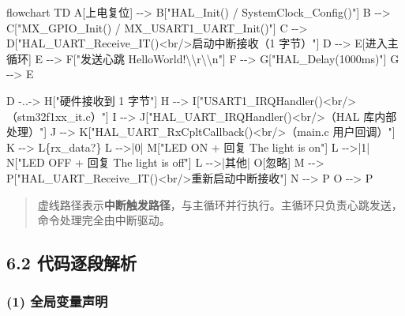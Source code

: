 \documentclass[
  chinese,
  UTF8,
  oneside,
  openany]{ctexbook}
\newenvironment{Shaded}{}{}
\newcommand{\NormalTok}[1]{#1}
\begin{document}
\begin{Shaded}
\begin{Highlighting}[]
\NormalTok{flowchart TD}
\NormalTok{    A[上电复位] {-}{-}\textgreater{} B["HAL\_Init() / SystemClock\_Config()"]}
\NormalTok{    B {-}{-}\textgreater{} C["MX\_GPIO\_Init() / MX\_USART1\_UART\_Init()"]}
\NormalTok{    C {-}{-}\textgreater{} D["HAL\_UART\_Receive\_IT()\textless{}br/\textgreater{}启动中断接收（1 字节）"]}
\NormalTok{    D {-}{-}\textgreater{} E[进入主循环]}
\NormalTok{    E {-}{-}\textgreater{} F["发送心跳 HelloWorld!\textbackslash{}\textbackslash{}r\textbackslash{}\textbackslash{}n"]}
\NormalTok{    F {-}{-}\textgreater{} G["HAL\_Delay(1000ms)"]}
\NormalTok{    G {-}{-}\textgreater{} E}

\NormalTok{    D {-}..{-}\textgreater{} H["硬件接收到 1 字节"]}
\NormalTok{    H {-}{-}\textgreater{} I["USART1\_IRQHandler()\textless{}br/\textgreater{}（stm32f1xx\_it.c）"]}
\NormalTok{    I {-}{-}\textgreater{} J["HAL\_UART\_IRQHandler()\textless{}br/\textgreater{}（HAL 库内部处理）"]}
\NormalTok{    J {-}{-}\textgreater{} K["HAL\_UART\_RxCpltCallback()\textless{}br/\textgreater{}（main.c 用户回调）"]}
\NormalTok{    K {-}{-}\textgreater{} L\{rx\_data?\}}
\NormalTok{    L {-}{-}\textgreater{}|\textquotesingle{}0\textquotesingle{}| M["LED ON + 回复 The light is on"]}
\NormalTok{    L {-}{-}\textgreater{}|\textquotesingle{}1\textquotesingle{}| N["LED OFF + 回复 The light is off"]}
\NormalTok{    L {-}{-}\textgreater{}|其他| O[忽略]}
\NormalTok{    M {-}{-}\textgreater{} P["HAL\_UART\_Receive\_IT()\textless{}br/\textgreater{}重新启动中断接收"]}
\NormalTok{    N {-}{-}\textgreater{} P}
\NormalTok{    O {-}{-}\textgreater{} P}
\end{Highlighting}
\end{Shaded}

\begin{quote}
虚线路径表示\textbf{中断触发路径}，与主循环并行执行。主循环只负责心跳发送，命令处理完全由中断驱动。
\end{quote}

\subsection{6.2
代码逐段解析}\label{ux4ee3ux7801ux9010ux6bb5ux89e3ux6790-1}

\subsubsection{(1)
全局变量声明}\label{ux5168ux5c40ux53d8ux91cfux58f0ux660e}
\end{document}
